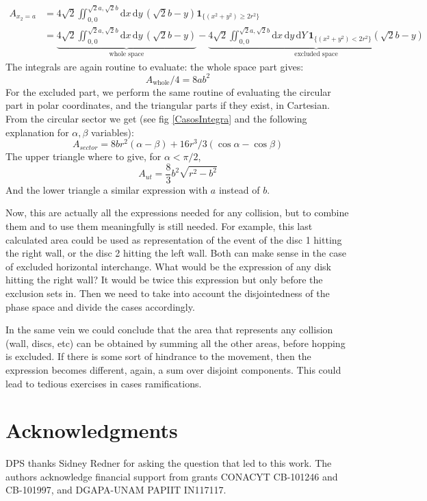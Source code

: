 \documentclass[superscriptaddress,pre,reprint,showpacs,onecolumn]{revtex4-1}
\newcommand{\rd}[1]{\mathrm{d}{#1} \,}
\newcommand{\indicator}[1]{\mathbf{1}_{ \{   #1 \} } }
\begin{document}
    \begin{align}
      A_{x_2=a} & =4\sqrt{2}\iint_{0,0}^{\sqrt{2}a,\sqrt{2}b}
        \rd x \rd y (\sqrt{2} b - y)
        \indicator{(x^2+y^2) \geq 2 r^2}\\
     &=\underbrace{4\sqrt{2}\iint_{0,0}^{\sqrt{2}a,\sqrt{2}b}
        \rd x \rd y (\sqrt{2} b - y)}_{\text{whole space}}
        -\underbrace{
          4\sqrt{2}\iint_{0,0}^{\sqrt{2}a,\sqrt{2}b}
        \rd x \rd y \rd Y 
        \indicator{(x^2+y^2) < 2 r^2}(\sqrt{2} b - y)}_{\text{excluded space}}
       \end{align}
    The integrals are again routine to evaluate: the whole space part
    gives:
    \begin{equation}
      A_{\text{whole}}/4=8ab^2
    \end{equation}
    For the excluded part, we perform the same routine of evaluating the circular part
    in polar coordinates, and the triangular parts if they exist, in Cartesian.
    From the circular sector we get (see fig \ref{CasosIntegra} and the following explanation
    for $\alpha, \beta$ variables):
    \begin{equation}
      A_{sector}=8 b r^2(\alpha-\beta)+16r^3/3(\cos\alpha - \cos\beta)
    \end{equation}
    The upper triangle where to give, for $\alpha < \pi/2$,
    \begin{equation}
    A_{ut}=\frac{8}{3}b^2\sqrt{r^2-b^2}
    \end{equation}
    And the lower triangle a similar expression with $a$ instead of $b$.

    Now, this are actually all the expressions needed for any collision, but
    to combine them and to use them meaningfully is still needed. For example,
    this last calculated area could be used as representation of the event of
    the disc 1 hitting the right wall, or the disc 2 hitting the left wall. Both
    can make sense in the case of excluded horizontal interchange. What would be
    the expression of any disk hitting the right wall? It would be twice this expression
    but only before the exclusion sets in. Then we need to take into account
    the disjointedness of the phase space and divide the cases accordingly.

    In the same vein we could conclude that the area that represents
    any collision (wall, discs, etc) can be obtained by summing all the other
    areas, before hopping is excluded. If there is some sort of hindrance to
    the movement, then the expression becomes different, again, a sum over
    disjoint components. This could lead to tedious exercises in cases ramifications.

    
    
    

    

    
\section{Acknowledgments}


DPS thanks Sidney Redner for asking the question that led to this work. The authors acknowledge financial support from grants CONACYT CB-101246 and CB-101997, and DGAPA-UNAM PAPIIT IN117117.






\end{document}
